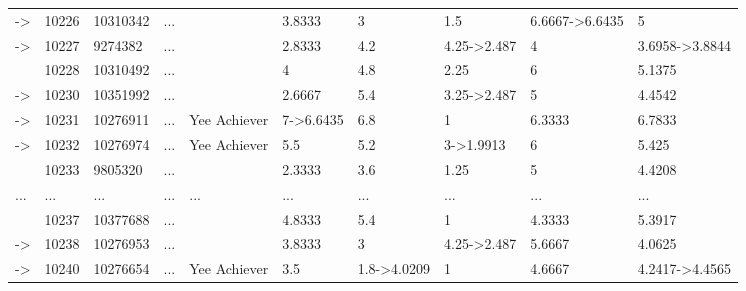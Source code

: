 \documentclass[6pt,a4paper]{article}
\begin{document}
\begin{landscape}
{\begin{longtable}{llllllllll}
-\textgreater &10226&10310342&...&&3.8333&3&1.5&6.6667-\textgreater 6.6435&5\tabularnewline
-\textgreater &10227&9274382&...&&2.8333&4.2&4.25-\textgreater 2.487&4&3.6958-\textgreater 3.8844\tabularnewline
&10228&10310492&...&&4&4.8&2.25&6&5.1375\tabularnewline
-\textgreater &10230&10351992&...&&2.6667&5.4&3.25-\textgreater 2.487&5&4.4542\tabularnewline
-\textgreater &10231&10276911&...&Yee Achiever&7-\textgreater 6.6435&6.8&1&6.3333&6.7833\tabularnewline
-\textgreater &10232&10276974&...&Yee Achiever&5.5&5.2&3-\textgreater 1.9913&6&5.425\tabularnewline
&10233&9805320&...&&2.3333&3.6&1.25&5&4.4208\tabularnewline
...&...&...&...&...&...&...&...&...&...\tabularnewline
&10237&10377688&...&&4.8333&5.4&1&4.3333&5.3917\tabularnewline
-\textgreater &10238&10276953&...&&3.8333&3&4.25-\textgreater 2.487&5.6667&4.0625\tabularnewline
-\textgreater &10240&10276654&...&Yee Achiever&3.5&1.8-\textgreater 4.0209&1&4.6667&4.2417-\textgreater 4.4565\tabularnewline
\hline
\end{longtable}}

\end{landscape}
\end{document}
